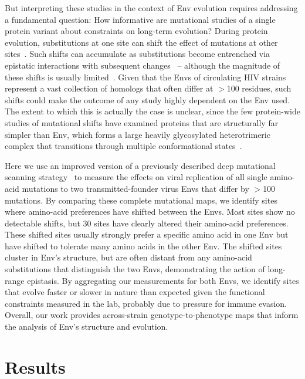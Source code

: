 \documentclass[9pt]{elife}
\begin{document}
But interpreting these studies in the context of Env evolution requires addressing a fundamental question: How informative are mutational studies of a single protein variant about constraints on long-term evolution?
During protein evolution, substitutions at one site can shift the effect of mutations at other sites~\citep{natarajan2013epistasis,gong2013stability,harms2014historical,podgornaia2015pervasive,starr2016epistasis}.
Such shifts can accumulate as substitutions become entrenched via epistatic interactions with subsequent changes~\citep{starr2017pervasive,pollock2012amino,shah2015contingency,bazykin2015changing} -- although the magnitude of these shifts is usually limited~\citep{doud2015site,chan2017correlation,ashenberg2013mutational,risso2014mutational}.
Given that the Envs of circulating HIV strains represent a vast collection of homologs that often differ at $>$100 residues, such shifts could make the outcome of any study highly dependent on the Env used.
The extent to which this is actually the case is unclear, since the few protein-wide studies of mutational shifts have examined proteins that are structurally far simpler than Env, which forms a large heavily glycosylated heterotrimeric complex that transitions through multiple conformational states~\citep{munro2014conformational,ozorowski2017open}.

Here we use an improved version of a previously described deep mutational scanning strategy~\citep{haddox2016experimental} to measure the effects on viral replication of all single amino-acid mutations to two transmitted-founder virus Envs that differ by $>$100 mutations.
By comparing these complete mutational maps, we identify sites where amino-acid preferences have shifted between the Envs.
Most sites show no detectable shifts, but 30 sites have clearly altered their amino-acid preferences.
These shifted sites usually strongly prefer a specific amino acid in one Env but have shifted to tolerate many amino acids in the other Env.
The shifted sites cluster in Env's structure, but are often distant from any amino-acid substitutions that distinguish the two Envs, demonstrating the action of long-range epistasis.
By aggregating our measurements for both Envs, we identify sites that evolve faster or slower in nature than expected given the functional constraints measured in the lab, probably due to pressure for immune evasion.
Overall, our work provides across-strain genotype-to-phenotype maps that inform the analysis of Env's structure and evolution.

\section{Results}
\end{document}
